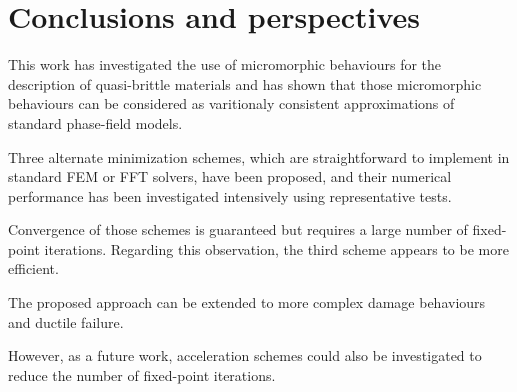 \section{Conclusions and perspectives}

This work has investigated the use of micromorphic behaviours for the
description of quasi-brittle materials and has shown that those
micromorphic behaviours can be considered as varitionaly consistent
approximations of standard phase-field models.

Three alternate minimization schemes, which are straightforward to
implement in standard FEM or FFT solvers, have been proposed, and their numerical performance has been investigated intensively using representative tests. 

Convergence of those schemes is guaranteed but requires a large number
of fixed-point iterations. Regarding this observation, the third
scheme appears to be more efficient.

The proposed approach can be extended to more complex damage behaviours
and ductile failure.

However, as a future work, acceleration schemes could also be
investigated to reduce the number of fixed-point iterations.
